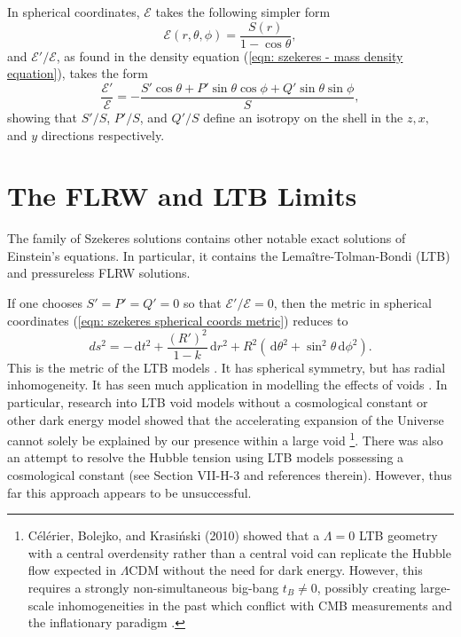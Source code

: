 \documentclass[a4paper,12pt]{report}
\newcommand{\diff}[1]{\,\text{d}{#1}}
\begin{document}
In spherical coordinates, $\mathcal{E}$ takes the following simpler form
\begin{equation}
  \mathcal{E}(r,\theta,\phi) = \frac{S(r)}{1-\cos\theta},
\end{equation}
and $\mathcal{E}'/\mathcal{E}$, as found in the density equation (\ref{eqn: szekeres - mass density equation}), takes the form
\begin{equation}
  \frac{\mathcal{E}'}{\mathcal{E}} = -\frac{S'\cos\theta + P'\sin\theta\cos\phi + Q'\sin\theta\sin\phi}{S},
\end{equation}
showing that $S'/S$, $P'/S$, and $Q'/S$ define an isotropy on the shell in the $z, x,$ and $y$ directions respectively.

\section{The FLRW and LTB Limits} \label{section: szekeres - geometry limits}
The family of Szekeres solutions contains other notable exact solutions of Einstein's equations. In particular, it contains the Lemaître-Tolman-Bondi (LTB) and pressureless FLRW solutions.

If one chooses $S'=P'=Q'=0$ so that $\mathcal{E}'/\mathcal{E} = 0$, then the metric in spherical coordinates (\ref{eqn: szekeres spherical coords metric}) reduces to
\begin{equation}
  ds^2 = -\diff{t}^2 + \frac{(R')^2}{1 - k}\diff{r}^2 + R^2 \left(\diff{\theta}^2 + \sin^2\theta\diff{\phi}^2\right).
\end{equation}
This is the metric of the LTB models \cite{RN62,RN135,RN136}. It has spherical symmetry, but has radial inhomogeneity. It has seen much application in modelling the effects of voids \cite{RN5,RN4}. In particular, research into LTB void models without a cosmological constant or other dark energy model showed that the accelerating expansion of the Universe cannot solely be explained by our presence within a large void \cite{RN128,RN129,RN130,RN131,RN127}\footnote{C\'el\'erier, Bolejko, and Krasi\'nski (2010) \cite{RN146} showed that a $\Lambda=0$ LTB geometry with a central overdensity rather than a central void can replicate the Hubble flow expected in $\Lambda$CDM without the need for dark energy. However, this requires a strongly non-simultaneous big-bang $t_B \neq 0$, possibly creating large-scale inhomogeneities in the past which conflict with CMB measurements and the inflationary paradigm \cite{RN195,RN196,RN140}.}. There was also an attempt to resolve the Hubble tension using LTB models possessing a cosmological constant (see \cite{RN137} Section VII-H-3 and references therein). However, thus far this approach appears to be unsuccessful.
\end{document}
